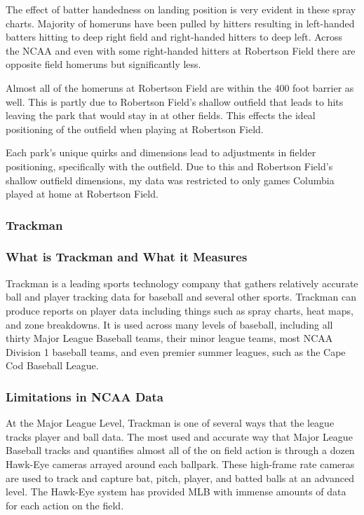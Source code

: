 \documentclass{article}
\begin{document}
The effect of batter handedness on landing position is very evident in these spray charts. Majority of homeruns have been pulled by hitters resulting in left-handed batters hitting to deep right field and right-handed hitters to deep left. Across the NCAA and even with some right-handed hitters at Robertson Field there are opposite field homeruns but significantly less. 

Almost all of the homeruns at Robertson Field are within the 400 foot barrier as well. This is partly due to Robertson Field's shallow outfield that leads to hits leaving the park that would stay in at other fields. This effects the ideal positioning of the outfield when playing at Robertson Field. 

Each park's unique quirks and dimensions lead to adjustments in fielder positioning, specifically with the outfield. Due to this and Robertson Field's shallow outfield dimensions, my data was restricted to only games Columbia played at home at Robertson Field.
\vspace{1cm}

\subsubsection{Trackman}
\subsubsection{What is Trackman and What it Measures}
Trackman is a leading sports technology company that gathers relatively accurate ball and player tracking data for baseball and several other sports. Trackman can produce reports on player data including things such as spray charts, heat maps, and zone breakdowns. It is used across many levels of baseball, including all thirty Major League Baseball teams, their minor league teams, most NCAA Division 1 baseball teams, and even premier summer leagues, such as the Cape Cod Baseball League. 


\subsubsection{Limitations in NCAA Data}
At the Major League Level, Trackman is one of several ways that the league tracks player and ball data. The most used and accurate way that Major League Baseball tracks and quantifies almost all of the on field action is through a dozen Hawk-Eye cameras arrayed around each ballpark. These high-frame rate cameras are used to track and capture bat, pitch, player, and batted balls at an advanced level. The Hawk-Eye system has provided MLB with immense amounts of data for each action on the field. 
\end{document}
